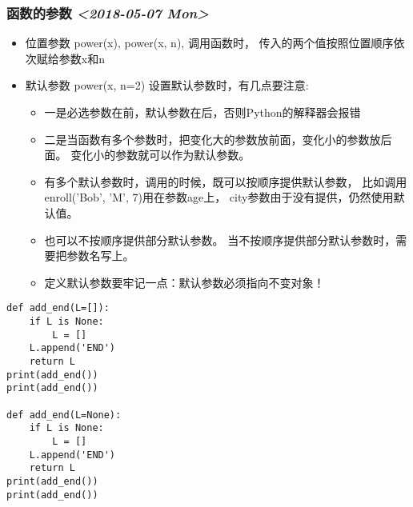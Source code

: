 \documentclass[11pt]{article}
\begin{document}
\subsubsection{函数的参数 \textit{<2018-05-07 Mon>}}
\label{sec:org65056ba}
\begin{itemize}
\item 位置参数 power(x), power(x, n), 调用函数时，
传入的两个值按照位置顺序依次赋给参数x和n
\item 默认参数 power(x, n=2)
设置默认参数时，有几点要注意:
\begin{itemize}
\item 一是必选参数在前，默认参数在后，否则Python的解释器会报错
\item 二是当函数有多个参数时，把变化大的参数放前面，变化小的参数放后面。
变化小的参数就可以作为默认参数。
\item 有多个默认参数时，调用的时候，既可以按顺序提供默认参数，
比如调用enroll('Bob', 'M', 7)用在参数age上，
city参数由于没有提供，仍然使用默认值。
\item 也可以不按顺序提供部分默认参数。
当不按顺序提供部分默认参数时，需要把参数名写上。
\item 定义默认参数要牢记一点：默认参数必须指向不变对象！
\end{itemize}
\end{itemize}
\begin{verbatim}
def add_end(L=[]):
    if L is None:
        L = []
    L.append('END')
    return L
print(add_end())
print(add_end())

def add_end(L=None):
    if L is None:
        L = []
    L.append('END')
    return L
print(add_end())
print(add_end())
\end{verbatim}
\end{document}
